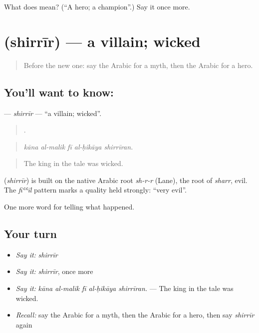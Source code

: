 \begin{tcolorbox}[breakable,colback=teal!4,colframe=teal!35!black,title={Before you move on}]
What does  mean? (\textquotedblleft{}A hero; a champion\textquotedblright{}.) Say it once more.
\end{tcolorbox}
\section[\texorpdfstring{\ar{شرير} (shirrīr)}{شرير (shirrīr)}]{ (shirrīr) — a villain; wicked}

\label{lesson:AR-C303-shirrir}



\begin{quote}
Before the new one: say the Arabic for a myth, then the Arabic for a hero.
\end{quote}

\subsection*{You'll want to know: }
\textbf{} — \emph{shirrīr} — \textquotedblleft{}a villain; wicked\textquotedblright{}.

\begin{quote}
    .
\end{quote}

\begin{quote}
\emph{kāna al-malik fī al-ḥikāya shirrīran.}
\end{quote}

\begin{quote}
The king in the tale was wicked.
\end{quote}

\begin{cousinweb}
\textbf{} (\emph{shirrīr}) is built on the native Arabic root \emph{sh-r-r} (Lane), the root of \emph{sharr}, evil. The \emph{fiʿʿīl} pattern marks a quality held strongly: \textquotedblleft{}very evil\textquotedblright{}.
\end{cousinweb}

\begin{grammarlens}[title={What you've built}]
One more word for telling what happened.
\end{grammarlens}

\subsection*{Your turn}
\begin{itemize}
\raggedright
  \item \emph{Say it:} \emph{shirrīr}
  \item \emph{Say it:} \emph{shirrīr}, once more
  \item \emph{Say it:} \emph{kāna al-malik fī al-ḥikāya shirrīran.} — The king in the tale was wicked.
  \item \emph{Recall:} say the Arabic for a myth, then the Arabic for a hero, then say \emph{shirrīr} again
\end{itemize}

